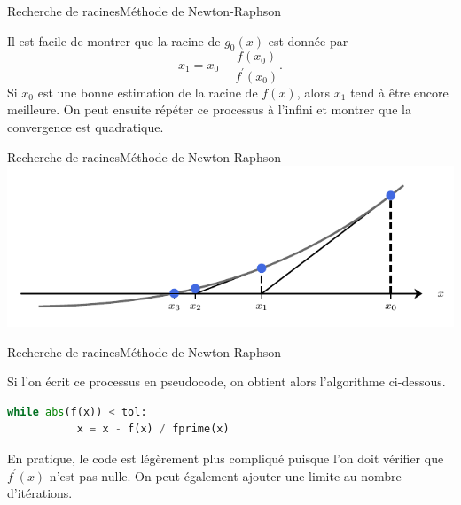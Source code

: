 \documentclass[usenames,dvipsnames,svgnames,10pt,aspectratio=169]{beamer}
\begin{document}
\begin{frame}[t, c]{Recherche de racines}{Méthode de Newton-Raphson}
  \begin{minipage}{.68\textwidth}
    Il est facile de montrer que la racine de $g_0(x)$ est donnée par
    \[
    x_1 = x_0 - \dfrac{f(x_0)}{f^{\prime}(x_0)}.
    \]
    Si $x_0$ est une bonne estimation de la racine de $f(x)$, alors $x_1$ tend à être encore meilleure.
    On peut ensuite répéter ce processus à l'infini et montrer que la convergence est quadratique.
  \end{minipage}%
  \hfill
  \begin{minipage}{.28\textwidth}
  \end{minipage}
\end{frame}

\begin{frame}[t, c]{Recherche de racines}{Méthode de Newton-Raphson}
  \centering
  \includegraphics[width=.8\textwidth]{Newton_method}
\end{frame}

\begin{frame}[t, c, fragile]{Recherche de racines}{Méthode de Newton-Raphson}
  \begin{minipage}{.68\textwidth}
    Si l'on écrit ce processus en pseudocode, on obtient alors l'algorithme ci-dessous.

    \bigskip

    \begin{lstlisting}[language=Python]
      while abs(f(x)) < tol:
           x = x - f(x) / fprime(x)
    \end{lstlisting}

    \bigskip

    En pratique, le code est légèrement plus compliqué puisque l'on doit vérifier que $f^{\prime}(x)$ n'est pas nulle.
    On peut également ajouter une limite au nombre d'itérations.
  \end{minipage}%
  \hfill
  \begin{minipage}{.28\textwidth}
  \end{minipage}
\end{frame}
\end{document}

